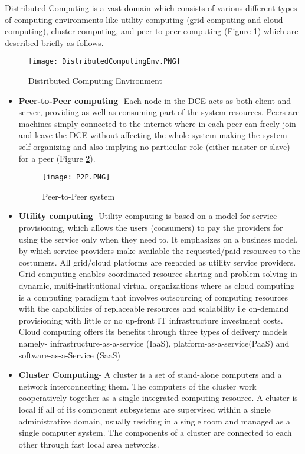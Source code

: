 Distributed Computing is a vast domain which consists of various different types of computing environments like utility computing (grid computing and cloud computing), cluster computing, and peer-to-peer computing (Figure \ref{fig:DistributedComputingEnv}) which are described briefly as follows.

\begin{figure}[ht!]
\centering
\texttt{[image: DistributedComputingEnv.PNG]}
\caption{Distributed Computing Environment}
\label{fig:DistributedComputingEnv}
\end{figure}

\begin{itemize}
\item \textbf{Peer-to-Peer computing}- Each node in the DCE acts as both client and server, providing as well as consuming part of the system resources. Peers are machines simply connected to the internet where in each peer can freely join and leave the DCE without affecting the whole system making the system self-organizing  and also implying no particular role (either master or slave) for a peer (Figure \ref{fig:P2P}).

\begin{figure}[ht!]
\centering
\texttt{[image: P2P.PNG]}
\caption{Peer-to-Peer system}
\label{fig:P2P}
\end{figure}

\item \textbf{Utility computing}- Utility computing is based on a model for service provisioning, which allows the users (consumers) to pay the providers for using the service only when they need to. It emphasizes on a business model, by which service providers make available the requested/paid resources to the costumers. All grid/cloud platforms are regarded as utility service providers. Grid computing enables coordinated resource sharing and problem solving in dynamic, multi-institutional virtual organizations where as cloud computing is a computing paradigm that involves outsourcing of computing resources with the capabilities of  replaceable resources and scalability i.e on-demand provisioning with little or no up-front IT infrastructure investment costs. Cloud computing offers its benefits through three types of delivery models namely- infrastructure-as-a-service (IaaS), platform-as-a-service(PaaS) and software-as-a-Service (SaaS) 

\item \textbf{Cluster Computing}- A cluster is a set of stand-alone computers and a network interconnecting them. The computers of the cluster work cooperatively together as a single integrated computing resource. A cluster is local if all of its component subsystems are supervised within a single administrative domain, usually residing in a single room and managed as a single computer system. The components of a cluster are connected to each other through fast local area networks. 

\end{itemize}

